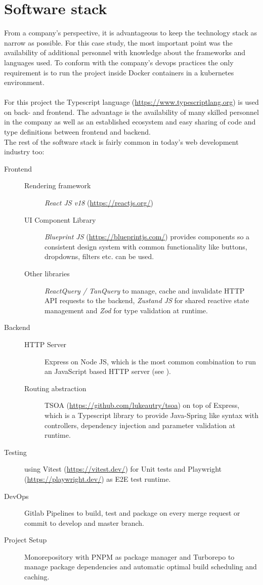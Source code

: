 \section{Software stack}
From a company's perspective, it is advantageous to keep the technology stack as narrow as possible.
For this case study, the most important point was the availability of additional personnel with knowledge about the frameworks and languages used.
To conform with the company's \Gls{devops} practices the only requirement is to run the project inside Docker containers in a \Gls{kubernetes} environment.
\\\\
For this project the Typescript language (\url{https://www.typescriptlang.org}) is used on back- and frontend.
The advantage is the availability of many skilled personnel in the company as well as an established ecosystem and easy sharing of code and type definitions between frontend and backend.
\\
The rest of the software stack is fairly common in today's web development industry too:

\begin{description}
  \item[Frontend] \leavevmode
  \begin{description}
    \item[Rendering framework] \textit{React JS v18} (\url{https://reactjs.org/})
    \item[UI Component Library] \textit{Blueprint JS} (\url{https://blueprintjs.com/}) provides components so a consistent design system with common functionality like buttons, dropdowns, filters etc. can be used.
    \item[Other libraries] \textit{ReactQuery / TanQuery} to manage, cache and invalidate HTTP API requests to the backend, \textit{Zustand JS} for shared reactive state management and \textit{Zod} for type validation at runtime.
  \end{description}
  \item[Backend] \leavevmode
  \begin{description}
    \item[HTTP Server] Express on Node JS, which is the most common combination to run an JavaScript based HTTP server (see \cite{Github:VanoDevium/node-framework-stars}).
    \item[Routing abstraction] TSOA (\url{https://github.com/lukeautry/tsoa}) on top of Express, which is a Typescript library to provide Java-Spring like syntax with controllers, dependency injection and parameter validation at runtime.
  \end{description}
  \item[Testing] using Vitest (\url{https://vitest.dev/}) for Unit tests and Playwright (\url{https://playwright.dev/}) as E2E test runtime. 
  \item[DevOps] Gitlab Pipelines to build, test and package on every merge request or commit to develop and master branch.
  \item[Project Setup] Monorepository with PNPM as package manager and Turborepo to manage package dependencies and automatic optimal build scheduling and caching.
\end{description}

